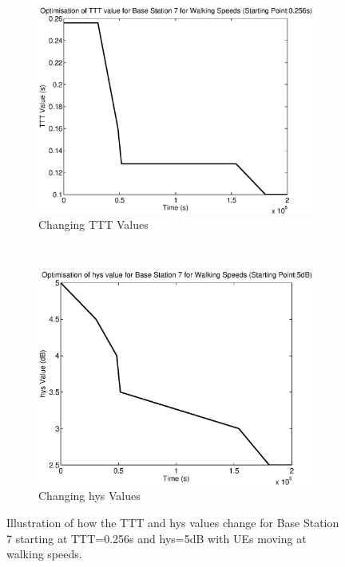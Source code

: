 \begin{figure}[H]
        \centering
        \begin{subfigure}[b]{0.49\textwidth}
                \includegraphics[width=\textwidth]{figures/graphs/walkmid/TTT7.eps}
                \caption{Changing TTT Values}
        \end{subfigure}%
        ~ %
        \begin{subfigure}[b]{0.49\textwidth}
                \includegraphics[width=\textwidth]{figures/graphs/walkmid/hys7.eps}
                \caption{Changing hys Values}
        \end{subfigure}
        \caption{Illustration of how the TTT and hys values change for Base Station 7 starting at TTT=0.256s and hys=5dB with UEs moving at walking speeds.}
\end{figure}
